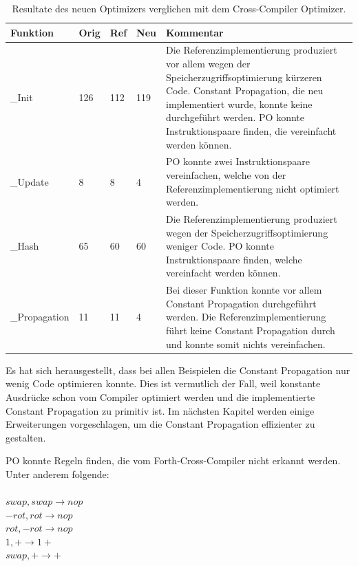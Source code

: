 \begin{table}[H]
\begin{center}
    \begin{tabular}{ | l | l | l | l | p{8cm} |}
    \hline
    \textbf{Funktion} & \textbf{Orig} & \textbf{Ref} & \textbf{Neu} & \textbf{Kommentar} \\ \hline
    \_Init & 126 & 112 & 119 & Die Referenzimplementierung produziert vor allem wegen der Speicherzugriffsoptimierung kürzeren Code. Constant Propagation, die neu implementiert wurde, konnte keine durchgeführt werden. PO konnte Instruktionspaare finden, die vereinfacht werden können.  \\ \hline
		\_Update & 8 & 8 & 4 & PO konnte zwei Instruktionspaare vereinfachen, welche von der Referenzimplementierung nicht optimiert werden. \\ \hline
		\_Hash & 65 & 60 & 60 & Die Referenzimplementierung produziert wegen der Speicherzugriffsoptimierung weniger Code. PO konnte Instruktionspaare finden, welche vereinfacht werden können. \\ \hline
		\_Propagation & 11 & 11 & 4 & Bei dieser Funktion konnte vor allem Constant Propagation durchgeführt werden. Die Referenzimplementierung führt keine Constant Propagation durch und konnte somit nichts vereinfachen. \\ \hline
    \end{tabular}
		\caption{Resultate des neuen Optimizers verglichen mit dem Cross-Compiler Optimizer.}
		\label{tab:peepresults}
\end{center}
\end{table}
\newpage

Es hat sich herausgestellt, dass bei allen Beispielen die Constant Propagation nur wenig Code optimieren konnte. Dies ist vermutlich der Fall, weil konstante Ausdrücke schon vom Compiler optimiert werden und die implementierte Constant Propagation zu primitiv ist. Im nächsten Kapitel werden einige Erweiterungen vorgeschlagen, um die Constant Propagation effizienter zu gestalten.  

PO konnte Regeln finden, die vom Forth-Cross-Compiler nicht erkannt werden. Unter anderem folgende:\\ \\
%
$swap, swap \rightarrow nop$\\
$-rot, rot \rightarrow nop$\\
$rot, -rot \rightarrow nop$\\
$1, + \rightarrow 1+$\\
$swap, + \rightarrow +$\\
%

